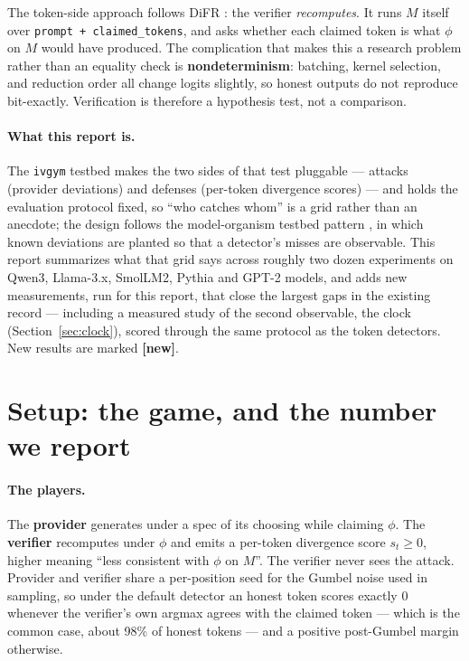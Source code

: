 \documentclass[11pt]{article}
\begin{document}
The token-side approach follows DiFR \cite{difr}: the verifier \emph{recomputes}. It
runs $M$ itself over \texttt{prompt + claimed\_tokens}, and asks whether each
claimed token is what $\phi$ on $M$ would have produced. The complication that makes
this a research problem rather than an equality check is \textbf{nondeterminism}:
batching, kernel selection, and reduction order all change logits slightly, so
honest outputs do not reproduce bit-exactly. Verification is therefore a hypothesis
test, not a comparison.

\paragraph{What this report is.} The \texttt{ivgym} testbed makes the two sides of
that test pluggable --- attacks (provider deviations) and defenses (per-token
divergence scores) --- and holds the evaluation protocol fixed, so ``who catches
whom'' is a grid rather than an anecdote; the design follows the model-organism
testbed pattern \cite{clymer}, in which known deviations are planted so that a
detector's misses are observable. This report summarizes what that grid says
across roughly two dozen experiments on Qwen3, Llama-3.x, SmolLM2, Pythia and GPT-2
models, and adds new measurements, run for this report, that close the largest
gaps in the existing record --- including a measured study of the second
observable, the clock (Section~\ref{sec:clock}), scored through the same protocol
as the token detectors. New results are marked \textbf{[new]}.

\section{Setup: the game, and the number we report}
\label{sec:setup}

\paragraph{The players.} The \textbf{provider} generates under a spec of its
choosing while claiming $\phi$. The \textbf{verifier} recomputes under $\phi$ and
emits a per-token divergence score $s_t \ge 0$, higher meaning ``less consistent
with $\phi$ on $M$''. The verifier never sees the attack. Provider and verifier
share a per-position seed for the Gumbel noise used in sampling, so under the
default detector an honest token scores exactly $0$ whenever the verifier's own
argmax agrees with the claimed token --- which is the common case, about 98\% of
honest tokens --- and a positive post-Gumbel margin otherwise.
\end{document}
